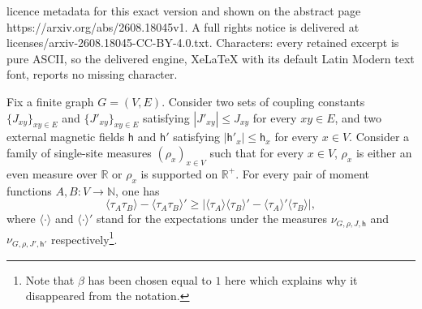 \documentclass[10pt,a4paper]{amsart}
\begin{document}
licence metadata for this exact version and shown on the abstract page https://arxiv.org/abs/2608.18045v1. A full rights notice is delivered at licenses/arxiv-2608.18045-CC-BY-4.0.txt. Characters: every retained excerpt is pure ASCII, so the delivered engine, XeLaTeX with its default Latin Modern text font, reports no missing character.
\begin{Prop} \label{prop: lebowitz}
Fix a finite graph $G = (V,E)$. Consider two sets of coupling constants $\{J_{xy}\}_{xy\in E}$ and $\{J'_{xy}\}_{xy\in E}$ satisfying $|J'_{xy}| \le J_{xy}$ for every $xy\in E$, and two external magnetic fields $\mathsf{h}$ and $\mathsf{h}'$ satisfying $|\mathsf{h}'_x|\le \mathsf{h}_x$ for every $x\in V$. Consider a family of single-site measures $(\rho_x)_{x\in V}$ such that for every $x\in V$, $\rho_x$ is either an even measure over $\mathbb{R}$ or $\rho_x$ is supported on $\mathbb{R}^+$. For every pair of moment functions $A, B:V\to\mathbb{N}$, one has
\begin{equation}
\langle \tau_A \tau_B \rangle - \langle \tau_A \tau_B \rangle' \ge |\langle \tau_A \rangle \langle\tau_B \rangle' - \langle \tau_A \rangle' \langle \tau_B \rangle|,
\end{equation}
where $\langle \cdot \rangle$ and $\langle \cdot \rangle'$ stand for the expectations under the measures $\nu_{G,\rho,J, \mathsf{h}}$ and $\nu_{G,\rho,J',\mathsf{h}'}$ respectively\footnote{Note that $\beta$ has been chosen equal to $1$ here which explains why it disappeared from the notation.}.
\end{Prop}
\end{document}
